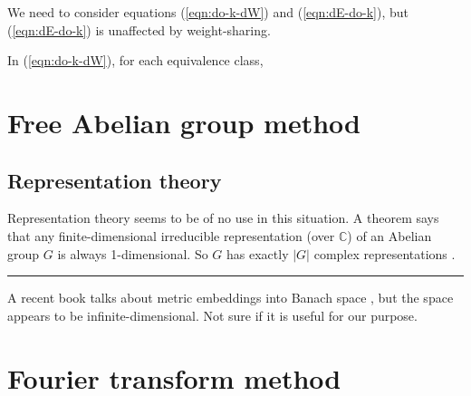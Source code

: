 We need to consider equations (\ref{eqn:do-k-dW}) and (\ref{eqn:dE-do-k}), but (\ref{eqn:dE-do-k}) is unaffected by weight-sharing.

In (\ref{eqn:do-k-dW}), for each equivalence class, 

\section{Free Abelian group method}

\subsection{Representation theory}

Representation theory seems to be of no use in this situation.  A theorem says that any finite-dimensional irreducible representation (over $\mathbb{C}$) of an Abelian group $G$ is always 1-dimensional.  So $G$ has exactly $|G|$ complex representations \parencite{Qiu2011}.

\hrule

A recent book talks about metric embeddings into Banach space \parencite{Ostrovskii2013}, but the space appears to be infinite-dimensional.  Not sure if it is useful for our purpose.

\section{Fourier transform method}

